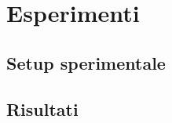 \chapter{Esperimenti}\label{esperimenti}

%
%
%
%

\section{Setup sperimentale}

\section{Risultati}
